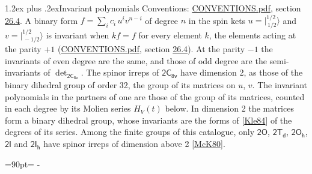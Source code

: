 \documentclass[10pt,a4paper]{article}
\makeatletter
\renewcommand\section{\@startsection{section}{1}{\z@}{-3ex plus -1ex minus -.2ex}%
  {1.2ex plus .2ex}{\normalfont\large\sffamily\bfseries\color{parttitle}}}
\newcommand{\needspace}[1]{\par\penalty-100\begingroup\dimen0=#1\relax\dimen2=\pagegoal
  \advance\dimen2-\pagetotal\ifdim\dimen0>\dimen2\relax\ifdim\dimen2>0pt\vfil\break\fi\fi
  \endgroup}
\numberwithin{equation}{section}
\newcommand{\grp}[1]{\mathsf{#1}}
\newcommand{\jm}[2]{\bigl\lvert{}^{#1}_{\,#2}\bigr\rangle}
\makeatother
\begin{document}
\section{Invariant polynomials}\label{s:invariants}
Conventions: \href{../../CONVENTIONS.pdf}{CONVENTIONS.pdf}, section \href{../../CONVENTIONS.pdf\#conv.26.4}{26.4}.
\leavevmode\label{n:local.binary.form}A binary form $f = \sum_i c_i\, u^i v^{n-i}$ of degree $n$ in the spin kets $u = \jm{1/2}{1/2}$ and $v = \jm{1/2}{-1/2}$ is invariant when $k f = f$ for every element $k$, the elements acting at the parity $+1$ (\href{../../CONVENTIONS.pdf}{CONVENTIONS.pdf}, section \href{../../CONVENTIONS.pdf\#conv.26.4}{26.4}). At the parity $-1$ the invariants of even degree are the same, and those of odd degree are the semi-invariants of $\det_{\grp{2C_{8v}}}$.
The spinor irreps of $\grp{2C_{8v}}$ have dimension 2, as those of the binary dihedral group of order 32, the group of its matrices on $u$, $v$. \label{n:function.hilbert}The invariant polynomials in the partners of one are those of the group of its matrices, counted in each degree by its Molien series $H_V(t)$ below. In dimension 2 the matrices form a binary dihedral group, whose invariants are the forms of [\href{../../../REFERENCES.pdf\#ref.Kle84}{Kle84}] of the degrees of its series. Among the finite groups of this catalogue, only $\grp{2O}$, $\grp{2T_{d}}$, $\grp{2O_{h}}$, $\grp{2I}$ and $\grp{2I_{h}}$ have spinor irreps of dimension above 2 [\href{../../../REFERENCES.pdf\#ref.McK80}{McK80}].
\needspace{90pt}
\end{document}
